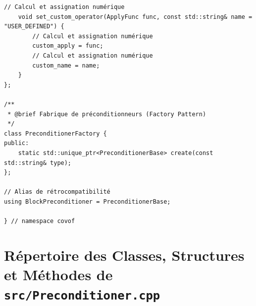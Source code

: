 \documentclass[10pt,a4paper,oneside]{book}
\begin{document}
\begin{lstlisting}[language={[11]C++}]
    // Calcul et assignation numérique
    void set_custom_operator(ApplyFunc func, const std::string& name = "USER_DEFINED") {
        // Calcul et assignation numérique
        custom_apply = func;
        // Calcul et assignation numérique
        custom_name = name;
    }
};

/**
 * @brief Fabrique de préconditionneurs (Factory Pattern)
 */
class PreconditionerFactory {
public:
    static std::unique_ptr<PreconditionerBase> create(const std::string& type);
};

// Alias de rétrocompatibilité
using BlockPreconditioner = PreconditionerBase;

} // namespace covof

\end{lstlisting}

\section{Répertoire des Classes, Structures et Méthodes de \texttt{src/Preconditioner.cpp}}
\end{document}
